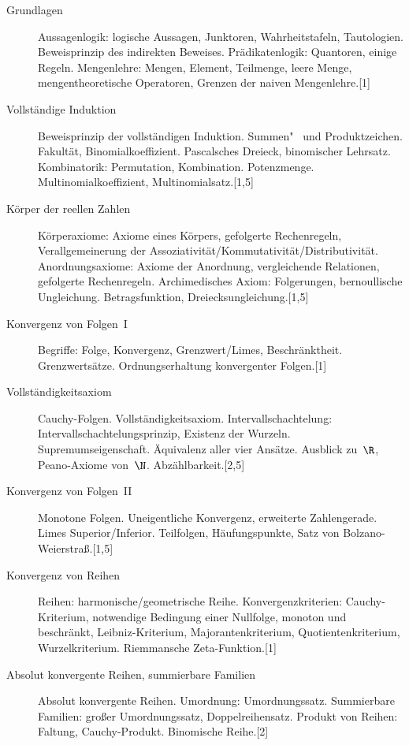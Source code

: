 \documentclass[a4paper]{article}
\begin{document}
\begin{description}
    \item[Grundlagen] Aussagenlogik: logische Aussagen, Junktoren, Wahrheitstafeln, Tautologien. Beweisprinzip des indirekten Beweises. Prädikatenlogik: Quantoren, einige Regeln. Mengenlehre: Mengen, Element, Teilmenge, leere Menge, mengentheoretische Operatoren, Grenzen der naiven Mengenlehre.\hspace*{\fill}[1]
    \item[Vollständige Induktion] Beweisprinzip der vollständigen Induktion. Summen"~ und Produktzeichen. Fakultät, Binomialkoeffizient. Pascalsches Dreieck, binomischer Lehrsatz. Kombinatorik: Permutation, Kombination. Potenzmenge. Multinomialkoeffizient, Multinomialsatz.\hspace*{\fill}[1,5]
    \item[Körper der reellen Zahlen] Körperaxiome: Axiome eines Körpers, gefolgerte Rechenregeln, Verallgemeinerung der Assoziativität/Kommutativität/Distributivität. Anordnungsaxiome: Axiome der Anordnung, vergleichende Relationen, gefolgerte Rechenregeln. Archimedisches Axiom: Folgerungen, bernoullische Ungleichung. Betragsfunktion, Dreiecksungleichung.\hspace*{\fill}[1,5]
    \item[Konvergenz von Folgen~I] Begriffe: Folge, Konvergenz, Grenzwert/Limes, Beschränktheit. Grenzwertsätze. Ordnungserhaltung konvergenter Folgen.\hspace*{\fill}[1]
    \item[Vollständigkeitsaxiom] Cauchy-Folgen. Vollständigkeitsaxiom. Intervallschachtelung: Intervallschachtelungsprinzip, Existenz der Wurzeln. Supremumseigenschaft. Äquivalenz aller vier Ansätze. Ausblick zu~$\R$, Peano-Axiome von~$\N$. Abzählbarkeit.\hspace*{\fill}[2,5]
    \item[Konvergenz von Folgen~II] Monotone Folgen. Uneigentliche Konvergenz, erweiterte Zahlengerade. Limes Superior/Inferior. Teilfolgen, Häufungspunkte, Satz von Bolzano-Weierstraß.\hspace*{\fill}[1,5]
    \item[Konvergenz von Reihen] Reihen: harmonische/geometrische Reihe. Konvergenzkriterien: Cauchy-Kriterium, notwendige Bedingung einer Nullfolge, monoton und beschränkt, Leibniz-Kriterium, Majorantenkriterium, Quotientenkriterium, Wurzelkriterium. Riemmansche Zeta-Funktion.\hspace*{\fill}[1]
    \item[Absolut konvergente Reihen, summierbare Familien] Absolut konvergente Reihen. Umordnung: Umordnungssatz. Summierbare Familien: großer Umordnungssatz, Doppelreihensatz. Produkt von Reihen: Faltung, Cauchy-Produkt. Binomische Reihe.\hspace*{\fill}[2]

\end{description}
\end{document}
